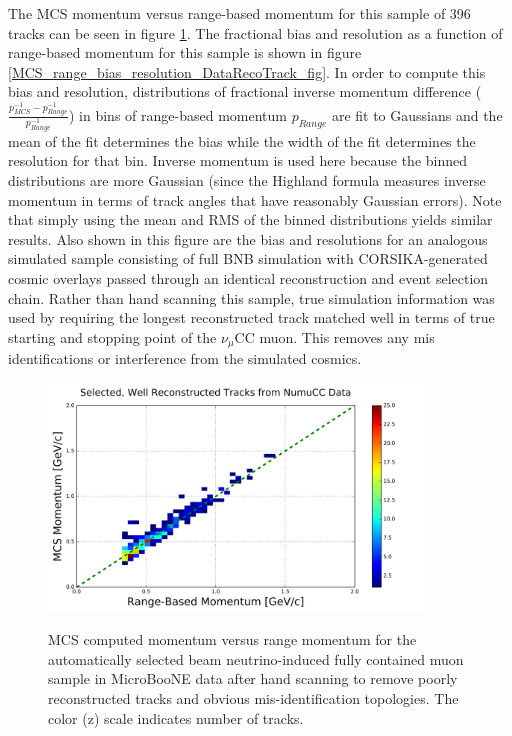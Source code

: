 \documentclass[a4paper,11pt]{article}
\begin{document}
The MCS momentum versus range-based momentum for this sample of 396 tracks can be seen in figure \ref{realdata_goodhandscan_fig}. The fractional bias and resolution as a function of range-based momentum for this sample is shown in figure \ref{MCS_range_bias_resolution_DataRecoTrack_fig}. In order to compute this bias and resolution, distributions of fractional inverse momentum difference ($\frac{p_{MCS}^{-1} - p_{Range}^{-1}}{p_{Range}^{-1}}$) in bins of range-based momentum $p_{Range}$ are fit to Gaussians and the mean of the fit determines the bias while the width of the fit determines the resolution for that bin. Inverse momentum is used here because the binned distributions are more Gaussian (since the Highland formula measures inverse momentum in terms of track angles that have reasonably Gaussian errors). Note that simply using the mean and RMS of the binned distributions yields similar results. Also shown in this figure are the bias and resolutions for an analogous simulated sample consisting of full BNB simulation with CORSIKA-generated \cite{corsika_ref} cosmic overlays passed through an identical reconstruction and event selection chain. Rather than hand scanning this sample, true simulation information was used by requiring the longest reconstructed track matched well in terms of true starting and stopping point of the $\nu_\mu$CC muon. This removes any mis identifications or interference from the simulated cosmics. 

\begin{figure}[ht!]
\centering
	\includegraphics[width=0.9\textwidth]{Figures/MCS_range_momentum_DataRecoTracks_goodhandscan.png} \\
\caption{MCS computed momentum versus range momentum for the automatically selected beam neutrino-induced fully contained muon sample in MicroBooNE data after hand scanning to remove poorly reconstructed tracks and obvious mis-identification topologies. The color (z) scale indicates number of tracks.}\label{realdata_goodhandscan_fig}
\end{figure}
\end{document}
